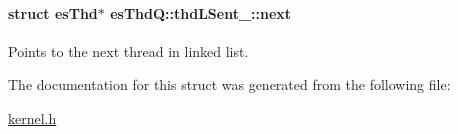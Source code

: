 \hypertarget{structesThdQ_1_1thdLSent___a0597468d0cfc6ac195d330d8ec7dde13}{
\paragraph[{next}]{\setlength{\rightskip}{0pt plus 5cm}struct {\bf es\-Thd}$\ast$ es\-Thd\-Q\-::thd\-L\-Sent\-\_\-\-::next}}\label{structesThdQ_1_1thdLSent___a0597468d0cfc6ac195d330d8ec7dde13}


Points to the next thread in linked list. 



The documentation for this struct was generated from the following file\-:\begin{DoxyCompactItemize}
\item 
\hyperlink{kernel_8h}{kernel.\-h}\end{DoxyCompactItemize}
